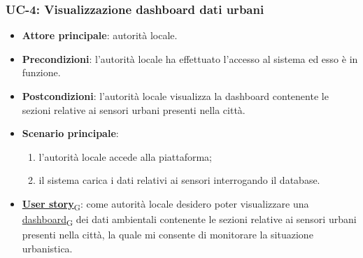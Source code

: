 \subsubsection{UC-4: Visualizzazione dashboard dati urbani}
\begin{itemize}
	\item \textbf{Attore principale}: autorità locale.
	\item \textbf{Precondizioni}: l'autorità locale ha effettuato l'accesso al sistema ed esso è in funzione.
	\item \textbf{Postcondizioni}: l'autorità locale visualizza la dashboard contenente le sezioni relative ai sensori urbani presenti nella città.
	\item \textbf{Scenario principale}:
	      \begin{enumerate}
		      \item l'autorità locale accede alla piattaforma;
		      \item il sistema carica i dati relativi ai sensori interrogando il database.
	      \end{enumerate}
	\item \href{https://7last.github.io/docs/rtb/documentazione-interna/glossario\#user-story}{\textbf{User story}\textsubscript{G}}: come autorità locale desidero poter visualizzare una \href{https://7last.github.io/docs/rtb/documentazione-interna/glossario\#dashboard}{dashboard\textsubscript{G}} dei dati ambientali contenente le sezioni relative ai sensori urbani presenti nella città, la quale mi consente di monitorare la situazione urbanistica.
\end{itemize}
\begin{center}
\end{center}

